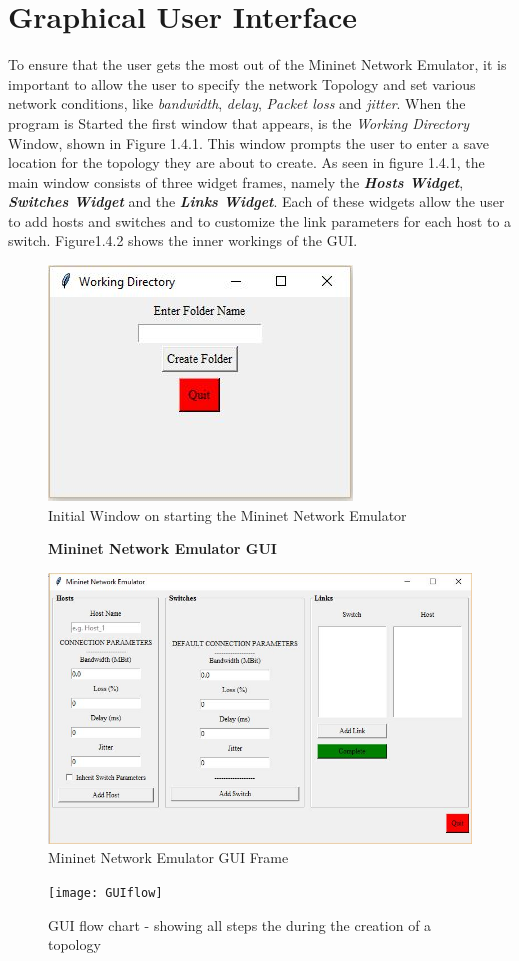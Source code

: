 \section{Graphical User Interface}
To ensure that the user gets the most out of the Mininet Network Emulator, it is important 
to allow the user to specify the network Topology and set various network conditions, like \textit{bandwidth}, \textit{delay},
\textit{Packet loss} and \textit{jitter}. When the program is Started the first window that appears, is the \textit{Working Directory} Window, shown in Figure 1.4.1. This window prompts the user to enter a save location for the topology they are about to create.  As seen in figure 1.4.1, the main window consists of three widget frames, namely the \textbf{\textit{Hosts Widget}},  \textbf{\textit{Switches Widget}} and the  \textbf{\textit{Links Widget}}. Each of these widgets allow the user to add hosts and switches and to customize the link parameters for each host to a switch. Figure1.4.2 shows the inner workings of the GUI.
\begin{figure}[H]
    \centering
    \includegraphics[scale=0.8]{Directory}
    \caption{Initial Window on starting the Mininet Network Emulator}
\end{figure}
\begin{figure}[H]
    \centering
    \textbf{Mininet Network Emulator GUI}\par\medskip
    \includegraphics[scale=0.5]{Entire_window}
    \caption{Mininet Network Emulator GUI Frame}
\end{figure}
\begin{figure}[H]
    \centering
    \texttt{[image: GUIflow]}
    \caption{GUI flow chart - showing all steps the during the creation of a topology}
\end{figure}

